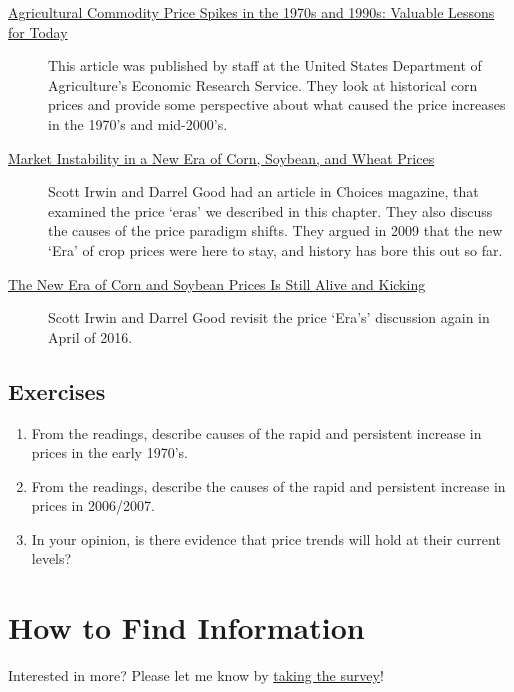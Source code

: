 \documentclass[
  letterpaper,
  DIV=11,
  numbers=noendperiod]{scrreprt}
\begin{document}
\begin{description}
\item[\href{pdf-Readings/ers-amber-waves-2009-ag-com-pr-sp-1970s-1990s.pdf}{Agricultural
Commodity Price Spikes in the 1970s and 1990s: Valuable Lessons for
Today}]
This article was published by staff at the United States Department of
Agriculture's Economic Research Service. They look at historical corn
prices and provide some perspective about what caused the price
increases in the 1970's and mid-2000's.
\item[\href{http://www.choicesmagazine.org/magazine/pdf/article_56.pdf}{Market
Instability in a New Era of Corn, Soybean, and Wheat Prices}]
Scott Irwin and Darrel Good had an article in Choices magazine, that
examined the price `eras' we described in this chapter. They also
discuss the causes of the price paradigm shifts. They argued in 2009
that the new `Era' of crop prices were here to stay, and history has
bore this out so far.
\item[\href{http://farmdocdaily.illinois.edu/2016/04/new-era-of-corn-and-soybean-prices.html}{The
New Era of Corn and Soybean Prices Is Still Alive and Kicking}]
Scott Irwin and Darrel Good revisit the price `Era's' discussion again
in April of 2016.
\end{description}

\section{Exercises}\label{exercises}

\begin{enumerate}
\def\labelenumi{\arabic{enumi}.}
\item
  From the readings, describe causes of the rapid and persistent
  increase in prices in the early 1970's.
\item
  From the readings, describe the causes of the rapid and persistent
  increase in prices in 2006/2007.
\item
  In your opinion, is there evidence that price trends will hold at
  their current levels?
\end{enumerate}


\chapter{How to Find Information}\label{how-to-find-information}

{Interested in more? Please let me know by}
\href{https://forms.gle/Q3VByCQZHjfQSy9D7}{taking the survey}!
\end{document}
